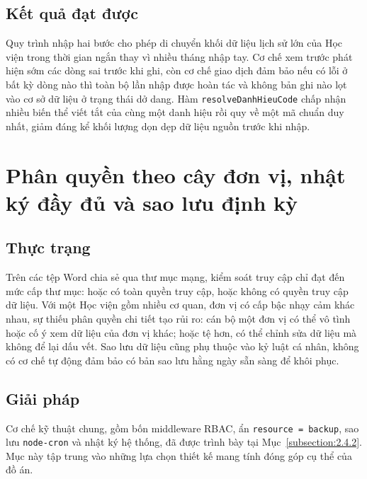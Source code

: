 \documentclass[../DoAn.tex]{subfiles}
\begin{document}
\subsection*{Kết quả đạt được}
Quy trình nhập hai bước cho phép di chuyển khối dữ liệu lịch sử lớn của Học viện trong thời gian ngắn thay vì nhiều tháng nhập tay. Cơ chế xem trước phát hiện sớm các dòng sai trước khi ghi, còn cơ chế giao dịch đảm bảo nếu có lỗi ở bất kỳ dòng nào thì toàn bộ lần nhập được hoàn tác và không bản ghi nào lọt vào cơ sở dữ liệu ở trạng thái dở dang. Hàm \texttt{resolveDanhHieuCode} chấp nhận nhiều biến thể viết tắt của cùng một danh hiệu rồi quy về một mã chuẩn duy nhất, giảm đáng kể khối lượng dọn dẹp dữ liệu nguồn trước khi nhập.

\section{Phân quyền theo cây đơn vị, nhật ký đầy đủ và sao lưu định kỳ}
\label{section:5.5}

\subsection*{Thực trạng}
Trên các tệp Word chia sẻ qua thư mục mạng, kiểm soát truy cập chỉ đạt đến mức cấp thư mục: hoặc có toàn quyền truy cập, hoặc không có quyền truy cập dữ liệu. Với một Học viện gồm nhiều cơ quan, đơn vị có cấp bậc nhạy cảm khác nhau, sự thiếu phân quyền chi tiết tạo rủi ro: cán bộ một đơn vị có thể vô tình hoặc cố ý xem dữ liệu của đơn vị khác; hoặc tệ hơn, có thể chỉnh sửa dữ liệu mà không để lại dấu vết. Sao lưu dữ liệu cũng phụ thuộc vào kỷ luật cá nhân, không có cơ chế tự động đảm bảo có bản sao lưu hằng ngày sẵn sàng để khôi phục.

\subsection*{Giải pháp}
Cơ chế kỹ thuật chung, gồm bốn middleware RBAC, ẩn \texttt{resource = backup}, sao lưu \texttt{node-cron} và nhật ký hệ thống, đã được trình bày tại Mục~\ref{subsection:2.4.2}. Mục này tập trung vào những lựa chọn thiết kế mang tính đóng góp cụ thể của đồ án.
\end{document}

